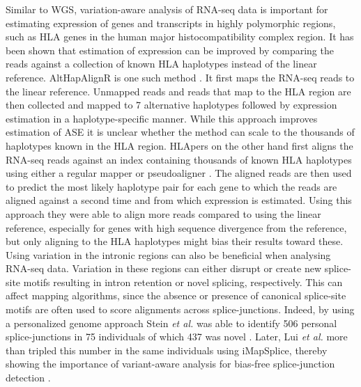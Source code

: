 Similar to WGS, variation-aware analysis of RNA-seq data is important for estimating expression of genes and transcripts in highly polymorphic regions, such as HLA genes in the human major histocompatibility complex region. 
It has been shown that estimation of expression can be improved by comparing the reads against a collection of known HLA haplotypes instead of the linear reference. 
AltHapAlignR is one such method \cite{Lee2018-mm}. It first maps the RNA-seq reads to the linear reference. Unmapped reads and reads that map to the HLA region are then collected and mapped to 7 alternative haplotypes followed by expression estimation in a haplotype-specific manner. 
While this approach improves estimation of ASE it is unclear whether the method can scale to the thousands of haplotypes known in the HLA region.
HLApers on the other hand first aligns the RNA-seq reads against an index containing thousands of known HLA haplotypes using either a regular mapper or pseudoaligner \cite{Aguiar2019-fy}.
The aligned reads are then used to predict the most likely haplotype pair for each gene to which the reads are aligned against a second time and from which expression is estimated.  
Using this approach they were able to align more reads compared to using the linear reference, especially for genes with high sequence divergence from the reference, but only aligning to the HLA haplotypes might bias their results toward these. \\

Using variation in the intronic regions can also be beneficial when analysing RNA-seq data. 
Variation in these regions can either disrupt or create new splice-site motifs resulting in intron retention or novel splicing, respectively. 
This can affect mapping algorithms, since the absence or presence of canonical splice-site motifs are often used to score alignments across splice-junctions. 
Indeed, by using a personalized genome approach Stein \textit{et al.} was able to identify 506 personal splice-junctions in 75 individuals of which 437 was novel \cite{Stein_2015}. 
Later, Lui \textit{et al.} more than tripled this number in the same individuals using iMapSplice, thereby showing the importance of variant-aware analysis for bias-free splice-junction detection \cite{Liu_2018}.



